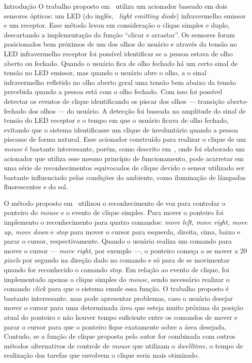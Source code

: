 \begin{chapter}{Introdução}
O trabalho proposto em~\cite{Skim10} utiliza um acionador baseado em dois
sensores ópticos: um LED (do inglês, ~\textit{light emitting diode})
infravermelho emissor e um receptor. Esse método levou em consideração o
clique simples e duplo, descartando a implementação da função ``clicar e
arrastar''. Os sensores foram posicionados bem próximos de um dos olhos do
usuário e através da tensão no LED infravermelho receptor foi possível
identificar se a pessoa estava de olho aberto ou fechado. Quando o usuário fica
de olho fechado há um certo sinal de tensão no LED emissor, mas quando o usuário
abre o olho, a o sinal infravermelho refletido no olho aberto geral uma tensão
bem abaixo da tensão percebida quando a pessoa está com o olho fechado. Com
isso foi possível detectar os eventos de clique identificando os piscar dos
olhos --- transição aberto-fechado dos olhos --- do usuário. A detecção foi
baseada na amplitude do sinal de tensão do LED receptor e o tempo em que o
usuário ficava de olho fechado, evitando que o sistema identificasse um clique
de involuntário quando a pessoa piscasse de forma natural. Esse acionador
construído para realizar o clique de um \textit{mouse} é bastante interessante,
porém, como descrito em~\cite{Batista17}, onde foi elaborado um acionador que
utiliza esse mesmo princípio de funcionamento, pode acarretar em uma série de
reconhecimentos equivocados de clique devido o sensor utilizado ser bastante
influenciado pelas condições do ambiente, como iluminação de lâmpadas
fluorescentes e do sol.

O método proposto em~\cite{Karimullah02} utilizou o reconhecimento de voz para
controlar o ponteiro do \textit{mouse} e o evento de clique simples. Para mover 
o ponteiro foi implemento o reconhecimento para quatro comandos: \textit{move
left, move right, move up, move down} e \textit{stop} para mover o cursor para
esquerda, direita, cima, baixo e parar o cursor, respectivamente. Quando o
usuário realiza um comando para mover o cursor --- \textit{move right}, por 
exemplo ---, o ponteiro começa a se mover a 20 \textit{pixels} por segundo na
direção dado no comando e só para de se movimentar quando for reconhecido o
camando \textit{stop}. Em relação ao evento de clique, foi implementado apenas o
clique simples do \textit{mouse}, sendo necessário realizar o comando 
\textit{click} para que o sistema emule essa função. O trabalho proposto é
bastante interessante, mas pode apresentar problemas, caso o usuário desejar
mover o cursor para uma determinada área que esteja muito próxima da posição
atual do ponteiro e não houver tempo suficiente entre os comandos de mover e
parar o cursor para que o ponteiro fique exatamente sobre a área desejada.
Contudo, se a função de clique proposta pelo autor for combinada com outros
métodos alternativos de controle de \textit{mouse} que utilizam o
\textit{dwelltime}, o tempo de realização das tarefas que envolvem o clique
seria mais otimizado.


\end{chapter}
